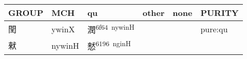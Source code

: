 \documentclass[14pt,a4paper]{scrartcl}
\begin{document}
\begin{longtable}[c]{@{}llllll@{}}
\toprule
\begin{minipage}[b]{0.14\columnwidth}\raggedright\strut
GROUP
\strut\end{minipage} &
\begin{minipage}[b]{0.14\columnwidth}\raggedright\strut
MCH
\strut\end{minipage} &
\begin{minipage}[b]{0.14\columnwidth}\raggedright\strut
qu
\strut\end{minipage} &
\begin{minipage}[b]{0.14\columnwidth}\raggedright\strut
other
\strut\end{minipage} &
\begin{minipage}[b]{0.14\columnwidth}\raggedright\strut
none
\strut\end{minipage} &
\begin{minipage}[b]{0.14\columnwidth}\raggedright\strut
PURITY
\strut\end{minipage}\tabularnewline
\midrule
\endhead
\begin{minipage}[t]{0.14\columnwidth}\raggedright\strut
閏
\strut\end{minipage} &
\begin{minipage}[t]{0.14\columnwidth}\raggedright\strut
ywinX
\strut\end{minipage} &
\begin{minipage}[t]{0.14\columnwidth}\raggedright\strut
潤\textsuperscript{6f64~nywinH}
\strut\end{minipage} &
\begin{minipage}[t]{0.14\columnwidth}\raggedright\strut
\strut\end{minipage} &
\begin{minipage}[t]{0.14\columnwidth}\raggedright\strut
\strut\end{minipage} &
\begin{minipage}[t]{0.14\columnwidth}\raggedright\strut
pure:qu
\strut\end{minipage}\tabularnewline
\begin{minipage}[t]{0.14\columnwidth}\raggedright\strut
猌
\strut\end{minipage} &
\begin{minipage}[t]{0.14\columnwidth}\raggedright\strut
nywinH
\strut\end{minipage} &
\begin{minipage}[t]{0.14\columnwidth}\raggedright\strut
憖\textsuperscript{6196~nginH}
\strut\end{minipage} &

\end{longtable}
\end{document}
